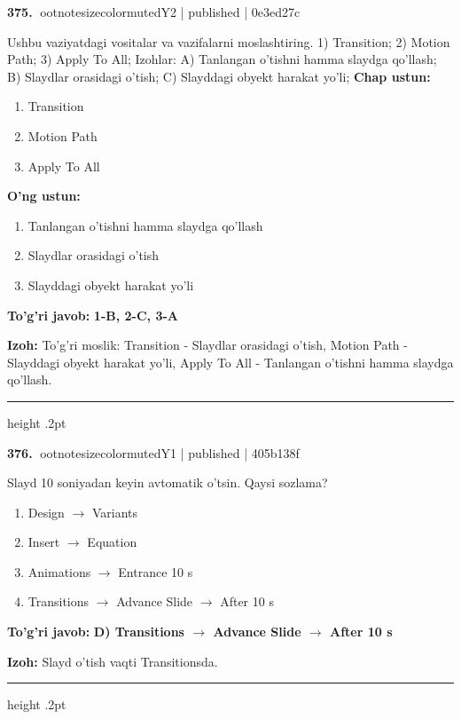 \documentclass[10pt,a4paper]{article}
\begin{document}
\textbf{\color{ink}375.} {ootnotesizecolor{muted}Y2 | published | 0e3ed27c}
\par
Ushbu vaziyatdagi vositalar va vazifalarni moslashtiring.  1) Transition;  2) Motion Path;  3) Apply To All;  Izohlar: A) Tanlangan o'tishni hamma slaydga qo'llash;  B) Slaydlar orasidagi o'tish;  C) Slayddagi obyekt harakat yo'li;
\textbf{Chap ustun:}\begin{enumerate}[label=\arabic*),leftmargin=9mm]
\item Transition
\item Motion Path
\item Apply To All
\end{enumerate}
\textbf{O'ng ustun:}\begin{enumerate}[label=\Alph*),leftmargin=9mm]
\item Tanlangan o'tishni hamma slaydga qo'llash
\item Slaydlar orasidagi o'tish
\item Slayddagi obyekt harakat yo'li
\end{enumerate}
\begin{tcolorbox}[enhanced,breakable,colback=teal!4,colframe=teal!55!black,boxrule=0.45pt,arc=1.2mm,left=2.8mm,right=2.8mm,top=2mm,bottom=2mm]
\textbf{\color{teal}To'g'ri javob:} \textbf{1-B, 2-C, 3-A}
\par\smallskip
\textbf{Izoh:} To'g'ri moslik: Transition - Slaydlar orasidagi o'tish, Motion Path - Slayddagi obyekt harakat yo'li, Apply To All - Tanlangan o'tishni hamma slaydga qo'llash.
\end{tcolorbox}
\vspace{2mm}\hrule height .2pt\vspace{2mm}

\textbf{\color{ink}376.} {ootnotesizecolor{muted}Y1 | published | 405b138f}
\par
Slayd 10 soniyadan keyin avtomatik o'tsin. Qaysi sozlama?
\begin{enumerate}[label=\Alph*),leftmargin=9mm]
\item Design \ensuremath{\rightarrow} Variants
\item Insert \ensuremath{\rightarrow} Equation
\item Animations \ensuremath{\rightarrow} Entrance 10 s
\item Transitions \ensuremath{\rightarrow} Advance Slide \ensuremath{\rightarrow} After 10 s
\end{enumerate}
\begin{tcolorbox}[enhanced,breakable,colback=teal!4,colframe=teal!55!black,boxrule=0.45pt,arc=1.2mm,left=2.8mm,right=2.8mm,top=2mm,bottom=2mm]
\textbf{\color{teal}To'g'ri javob:} \textbf{D) Transitions \ensuremath{\rightarrow} Advance Slide \ensuremath{\rightarrow} After 10 s}
\par\smallskip
\textbf{Izoh:} Slayd o'tish vaqti Transitionsda.
\end{tcolorbox}
\vspace{2mm}\hrule height .2pt\vspace{2mm}
\end{document}
